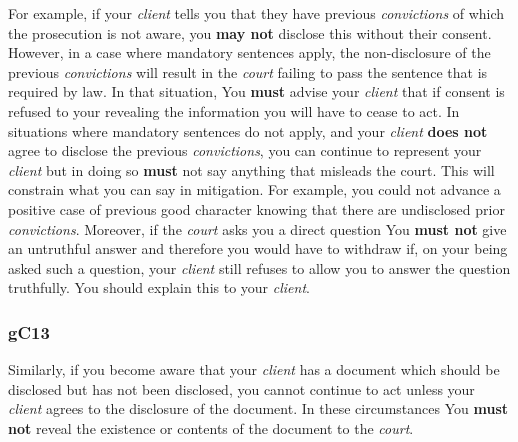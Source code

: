 For example, if your \emph{client} tells you that they have previous
\emph{convictions} of which the prosecution is not aware, you \textcolor{myred}{\textbf{may not}}
disclose this without their consent. However, in a case where mandatory
sentences apply, the non-disclosure of the previous \emph{convictions}
will result in the \emph{court} failing to pass the sentence that is
required by law. In that situation, You \textcolor{myred}{\textbf{must}} advise your \emph{client}
that if consent is refused to your revealing the information you will
have to cease to act. In situations where mandatory sentences do not
apply, and your \emph{client} \textcolor{myred}{\textbf{does not}} agree to disclose the previous
\emph{convictions}, you can continue to represent your \emph{client} but
in doing so \textcolor{myred}{\textbf{must}} not say anything that misleads the court. This will
constrain what you can say in mitigation. For example, you could not
advance a positive case of previous good character knowing that there
are undisclosed prior \emph{convictions}. Moreover, if the \emph{court}
asks you a direct question You \textcolor{myred}{\textbf{must not}} give an untruthful answer and
therefore you would have to withdraw if, on your being asked such a
question, your \emph{client} still refuses to allow you to answer the
question truthfully. You should explain this to your \emph{client}.

\subsubsection{\color{darkgrey}gC13}

Similarly, if you become aware that your \emph{client} has a document
which should be disclosed but has not been disclosed, you cannot
continue to act unless your \emph{client} agrees to the disclosure of
the document. In these circumstances You \textcolor{myred}{\textbf{must not}} reveal the existence
or contents of the document to the \emph{court}.





